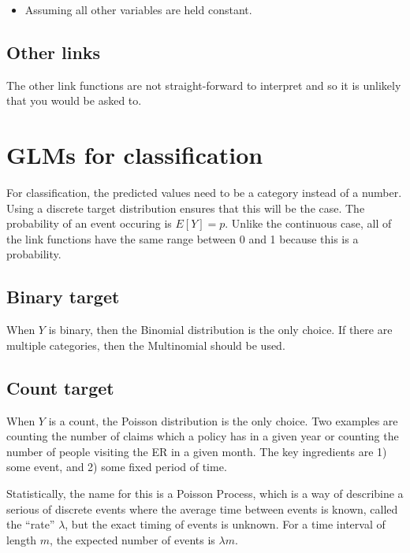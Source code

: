 \documentclass[openany]{book}
\providecommand{\tightlist}{%
  \setlength{\itemsep}{0pt}\setlength{\parskip}{0pt}}
\begin{document}
\begin{itemize}
\tightlist
\item
  Assuming all other variables are held constant.
\end{itemize}

\hypertarget{other-links}{%
\section{Other links}\label{other-links}}

The other link functions are not straight-forward to interpret and so it is unlikely that you would be asked to.

\hypertarget{glms-for-classification}{%
\chapter{GLMs for classification}\label{glms-for-classification}}

For classification, the predicted values need to be a category instead of a number. Using a discrete target distribution ensures that this will be the case. The probability of an event occuring is \(E[Y] = p\). Unlike the continuous case, all of the link functions have the same range between 0 and 1 because this is a probability.

\hypertarget{binary-target}{%
\section{Binary target}\label{binary-target}}

When \(Y\) is binary, then the Binomial distribution is the only choice. If there are multiple categories, then the Multinomial should be used.

\hypertarget{count-target}{%
\section{Count target}\label{count-target}}

When \(Y\) is a count, the Poisson distribution is the only choice. Two examples are counting the number of claims which a policy has in a given year or counting the number of people visiting the ER in a given month. The key ingredients are 1) some event, and 2) some fixed period of time.

Statistically, the name for this is a Poisson Process, which is a way of describine a serious of discrete events where the average time between events is known, called the ``rate'' \(\lambda\), but the exact timing of events is unknown. For a time interval of length \(m\), the expected number of events is \(\lambda m\).
\end{document}
